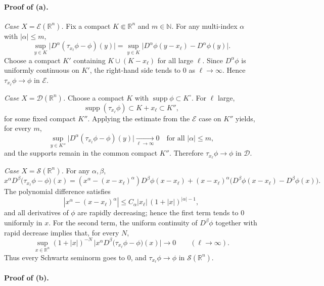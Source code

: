 \documentclass[12pt,a4paper]{article}
\theoremstyle{plain}
\theoremstyle{definition}
\theoremstyle{remark}
\theoremstyle{remark}
\begin{document}
\paragraph{Proof of (a).}

\bigskip

\textit{Case $X=\mathcal E(\mathbb R^n)$.}
Fix a compact $K\Subset\mathbb R^n$ and $m\in\mathbb N$. For any multi-index $\alpha$ with $|\alpha|\le m$,
\[
\sup_{y\in K}\big|D^\alpha(\tau_{x_\ell}\phi-\phi)(y)\big|
=\sup_{y\in K}\big|D^\alpha\phi(y-x_\ell)-D^\alpha\phi(y)\big|.
\]
Choose a compact $K'$ containing $K\cup(K-x_\ell)$ for all large $\ell$. Since $D^\alpha\phi$ is uniformly continuous on $K'$, the right-hand side tends to $0$ as $\ell\to\infty$. Hence $\tau_{x_\ell}\phi\to\phi$ in $\mathcal E$.

\bigskip

\textit{Case $X=\mathcal D(\mathbb R^n)$.}
Choose a compact $K$ with $\operatorname{supp}\phi\subset K^\circ$. For $\ell$ large,
\[
\operatorname{supp}(\tau_{x_\ell}\phi)\subset K+x_\ell\subset K'',
\]
for some fixed compact $K''$. Applying the estimate from the $\mathcal E$ case on $K''$ yields, for every $m$,
\[
\sup_{y\in K''}\big|D^\alpha(\tau_{x_\ell}\phi-\phi)(y)\big|\xrightarrow[\ell\to\infty]{}0
\quad\text{for all }|\alpha|\le m,
\]
and the supports remain in the common compact $K''$. Therefore $\tau_{x_\ell}\phi\to\phi$ in $\mathcal D$.

\bigskip

\textit{Case $X=\mathcal S(\mathbb R^n)$.}
For any $\alpha,\beta$,
\[
x^\alpha D^\beta\big(\tau_{x_\ell}\phi-\phi\big)(x)
=(x^\alpha-(x-x_\ell)^\alpha)D^\beta\phi(x-x_\ell)
+(x-x_\ell)^\alpha\big(D^\beta\phi(x-x_\ell)-D^\beta\phi(x)\big).
\]
The polynomial difference satisfies
\[
|x^\alpha-(x-x_\ell)^\alpha|\le C_\alpha |x_\ell|\,(1+|x|)^{|\alpha|-1},
\]
and all derivatives of $\phi$ are rapidly decreasing; hence the first term tends to $0$ uniformly in $x$.
For the second term, the uniform continuity of $D^\beta\phi$ together with rapid decrease implies that, for every $N$,
\[
\sup_{x\in\mathbb R^n}(1+|x|)^{-N}\,
\big|x^\alpha D^\beta\big(\tau_{x_\ell}\phi-\phi\big)(x)\big|\longrightarrow 0
\qquad (\ell\to\infty).
\]
Thus every Schwartz seminorm goes to $0$, and $\tau_{x_\ell}\phi\to\phi$ in $\mathcal S(\mathbb R^n)$.


\paragraph{Proof of (b).}
\end{document}

